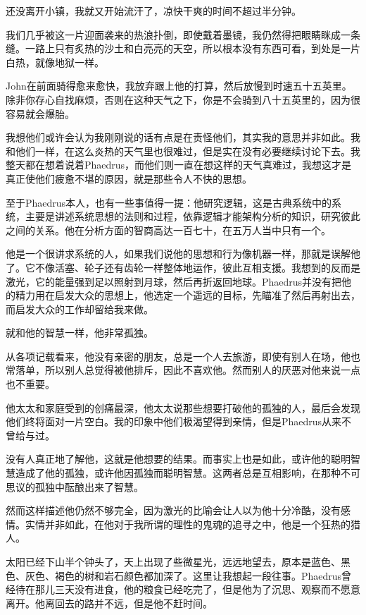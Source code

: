 \documentclass[UTF8]{article}
\begin{document}
\par 还没离开小镇，我就又开始流汗了，凉快干爽的时间不超过半分钟。
\par 我们几乎被这一片迎面袭来的热浪扑倒，即使戴着墨镜，我仍然得把眼睛眯成一条缝。一路上只有炙热的沙土和白亮亮的天空，所以根本没有东西可看，到处是一片白热，就像地狱一样。
\par John在前面骑得愈来愈快，我放弃跟上他的打算，然后放慢到时速五十五英里。除非你存心自找麻烦，否则在这种天气之下，你是不会骑到八十五英里的，因为很容易就会爆胎。
\par 我想他们或许会认为我刚刚说的话有点是在责怪他们，其实我的意思并非如此。我和他们一样，在这么炎热的天气里也很难过，但是实在没有必要继续讨论下去。我整天都在想着说着Phaedrus，而他们则一直在想这样的天气真难过，我想这才是真正使他们疲惫不堪的原因，就是那些令人不快的思想。
\par 至于Phaedrus本人，也有一些事值得一提：他研究逻辑，这是古典系统中的系统，主要是讲述系统思想的法则和过程，依靠逻辑才能架构分析的知识，研究彼此之间的关系。他在分析方面的智商高达一百七十，在五万人当中只有一个。
\par 他是一个很讲求系统的人，如果我们说他的思想和行为像机器一样，那就是误解他了。它不像活塞、轮子还有齿轮一样整体地运作，彼此互相支援。我想到的反而是激光，它的能量强到足以照射到月球，然后再折返回地球。Phaedrus并没有把他的精力用在启发大众的思想上，他选定一个遥远的目标，先瞄准了然后再射出去，而启发大众的工作却留给我来做。
\par 就和他的智慧一样，他非常孤独。
\par 从各项记载看来，他没有亲密的朋友，总是一个人去旅游，即使有别人在场，他也常落单，所以别人总觉得被他排斥，因此不喜欢他。然而别人的厌恶对他来说一点也不重要。
\par 他太太和家庭受到的创痛最深，他太太说那些想要打破他的孤独的人，最后会发现他们终将面对一片空白。我的印象中他们极渴望得到亲情，但是Phaedrus从来不曾给与过。
\par 没有人真正地了解他，这就是他想要的结果。而事实上也是如此，或许他的聪明智慧造成了他的孤独，或许他因孤独而聪明智慧。这两者总是互相影响，在那种不可思议的孤独中酝酿出来了智慧。
\par 然而这样描述他仍然不够完全，因为激光的比喻会让人以为他十分冷酷，没有感情。实情并非如此，在他对于我所谓的理性的鬼魂的追寻之中，他是一个狂热的猎人。
\par 太阳已经下山半个钟头了，天上出现了些微星光，远远地望去，原本是蓝色、黑色、灰色、褐色的树和岩石颜色都加深了。这里让我想起一段往事。Phaedrus曾经待在那儿三天没有进食，他的粮食已经吃完了，但是他为了沉思、观察而不愿意离开。他离回去的路并不远，但是他不赶时间。
\end{document}
